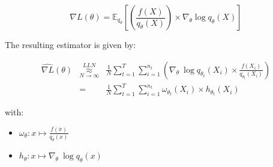$$\boxed{\nabla L(\theta) = \mathbb E_{q_\theta}\left[ \left(\frac{f(X)}{q_\theta(X)}\right) \times \nabla_\theta \log q_\theta(X) \right]}$$

The resulting estimator is given by:

$$
\begin{array}{rcl}
\widehat{\nabla L}(\theta) 
&\underset{N \rightarrow \infty }{\overset{LLN}{\approx}}& 
\frac 1 N \displaystyle\sum\limits_{t=1}^T\sum\limits_{i = 1}^{n_t} \left( \nabla_\theta \ \log q_{\theta_t} (X_i) \times \frac{f(X_i)}{q_{\theta_t}(X_i)}\right)
\\
&=& \frac 1 N \displaystyle \sum\limits_{t = 1}^{T} \sum_{i = 1}^{n_t} \omega_{\theta_t}(X_i) \times h_{\theta_t}(X_i)
\end{array}
$$

with:
\begin{itemize}
    \item $\omega_\theta : x \mapsto \frac{f(x)}{q_\theta(x)}$
    \item $h_\theta : x \mapsto \nabla_\theta \ \log q_\theta(x)$
\end{itemize}